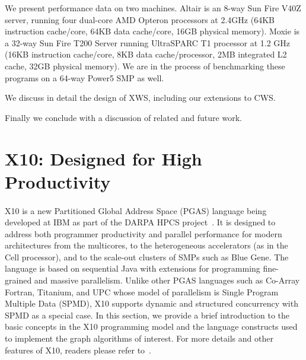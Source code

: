 \documentclass[10pt]{article}
\numberwithin{equation}{section}
\def\Xten{{\sf X10}}
\def\XWS{{\sf XWS}}
\begin{document}
We present performance data on two machines. Altair is an 8-way Sun
Fire V40Z server, running four dual-core AMD Opteron processors at
2.4GHz (64KB instruction cache/core, 64KB data cache/core, 16GB
physical memory). Moxie is a 32-way Sun Fire T200 Server running
UltraSPARC T1 processor at 1.2 GHz (16KB instruction cache/core, 8KB
data cache/processor, 2MB integrated L2 cache, 32GB physical
memory). We are in the process of benchmarking these programs on a
64-way Power5 SMP as well. 

We discuss in detail the design of \XWS, including our extensions to CWS.

Finally we conclude with a discussion of related and future work.


  
\section{\Xten{}: Designed for High Productivity}\label{s:x10}
\paragraph{}\Xten{} is a new Partitioned Global Address Space (PGAS) language being developed at IBM as part of the DARPA HPCS project~\cite{X10-OOPSLA05}. It is designed to address both programmer productivity and parallel performance for modern architectures from the multicores, to the heterogeneous accelerators (as in the Cell processor), and to the scale-out clusters of SMPs such as Blue Gene.  The language is based on sequential Java with extensions for programming fine-grained and massive parallelism. Unlike other PGAS languages such as Co-Array Fortran, Titanium, and UPC whose model of parallelism is Single Program Multiple Data (SPMD), \Xten{} supports dynamic and structured concurrency with SPMD as a special case. In this section, we provide a brief introduction to the basic concepts in the \Xten{} programming model and the language constructs used to implement the graph algorithms of interest. For more details and other features of \Xten{}, readers please refer to~\cite{X10-OOPSLA05}.
 
\end{document}
